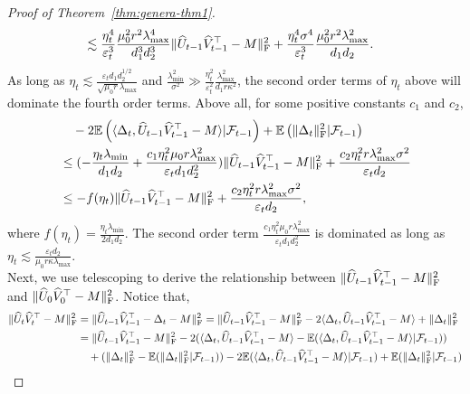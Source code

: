 \documentclass[12pt]{article}
\newcommand\fro[1]{\| #1 \|_{\rm{F}}}
\newcommand{\inp}[2]{\langle #1,#2\rangle}
\def\EE{{\mathbb E}}
\theoremstyle{plain}
\begin{document}
\begin{proof}[Proof of Theorem~\ref{thm:genera-thm1}]
\begin{align*}
        &\lesssim \frac{\eta_t^4}{\varepsilon_t^3}\frac{\mu_0^2r^2\lambda_{\max}^4}{d_1^3d_2^3}\fro{\widehat{U}_{t-1}\widehat{V}_{t-1}^{\top}-M}^2 + \frac{\eta_t^4\sigma^4}{\varepsilon_t^3}\frac{\mu_0^2r^2\lambda_{\max}^2}{d_1d_2}.
    \end{align*}
    As long as $\eta_t\lesssim \frac{\varepsilon_td_1d_2^{1/2}}{\sqrt{\mu_0r}\lambda_{\max}}$ and $\frac{\lambda_{\min}^2}{\sigma^2}\gg \frac{\eta_t^2}{\varepsilon_t^2}\frac{\lambda_{\max}^2}{d_1r\kappa^2}$, the second order terms of $\eta_t$ above will dominate the fourth order terms. Above all, for some positive constants $c_1$ and $c_2$, 
    \begin{align*}
        &\quad - 2\EE\left(\inp{\Delta_t}{\widehat{U}_{t-1}\widehat{V}_{t-1}^{\top}-M}|\mathcal{F}_{t-1}\right) + \EE\left(\fro{\Delta_t}^2|\mathcal{F}_{t-1}\right) \\
        &\leq (-\frac{\eta_t\lambda_{\min}}{d_1d_2} + \frac{c_1\eta_t^2\mu_0r\lambda_{\max}^2}{\varepsilon_td_1d_2^2})\fro{\widehat{U}_{t-1}\widehat{V}_{t-1}^{\top}-M}^2+\frac{c_2\eta_t^2r\lambda_{\max}^2\sigma^2}{\varepsilon_td_2} \\
        &\leq -f(\eta_t)\fro{\widehat{U}_{t-1}\widehat{V}_{t-1}^{\top}-M}^2+\frac{c_2\eta_t^2r\lambda_{\max}^2\sigma^2}{\varepsilon_td_2},
    \end{align*}
    where $f(\eta_t)=\frac{\eta_t\lambda_{\min}}{2d_1d_2}$. The second order term $\frac{c_1\eta_t^2\mu_0r\lambda_{\max}^2}{\varepsilon_td_1d_2^2}$ is dominated as long as $\eta_t\lesssim \frac{\varepsilon_t d_2}{\mu_0r\kappa\lambda_{\max}}$.\\
    Next, we use telescoping to derive the relationship between $\fro{\widehat{U}_{t-1}\widehat{V}_{t-1}^{\top}-M}^2$ and $\fro{\widehat{U}_{0}\widehat{V}_{0}^{\top}-M}^2$. Notice that,
    \begin{align*}
        \fro{\widehat{U}_{t}\widehat{V}_{t}^{\top} - M}^2 &= \fro{\widehat{U}_{t-1}\widehat{V}_{t-1}^{\top} - \Delta_t - M}^2 = \fro{\widehat{U}_{t-1}\widehat{V}_{t-1}^{\top} - M}^2 - 2\inp{\Delta_t}{\widehat{U}_{t-1}\widehat{V}_{t-1}^{\top} - M} +\fro{\Delta_t}^2\\
        & = \fro{\widehat{U}_{t-1}\widehat{V}_{t-1}^{\top} - M}^2 - 2(\inp{\Delta_t}{\widehat{U}_{t-1}\widehat{V}_{t-1}^{\top}-M} -\EE(\inp{\Delta_t}{\widehat{U}_{t-1}\widehat{V}_{t-1}^{\top}-M}|\mathcal{F}_{t-1})) \\
        &\quad+ (\fro{\Delta_t}^2 - \EE(\fro{\Delta_t}^2|\mathcal{F}_{t-1})) - 2\EE(\inp{\Delta_t}{\widehat{U}_{t-1}\widehat{V}_{t-1}^{\top}-M}|\mathcal{F}_{t-1}) + \EE(\fro{\Delta_t}^2|\mathcal{F}_{t-1})\\

\end{align*}
\end{proof}
\end{document}
